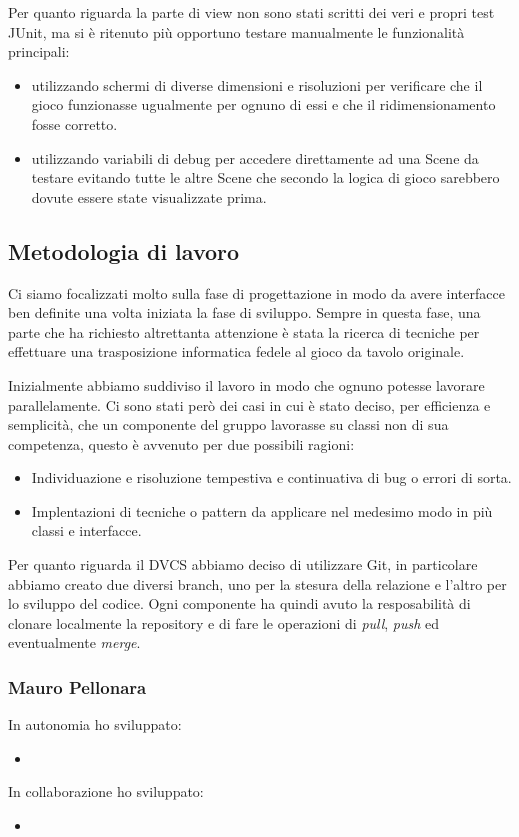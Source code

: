 Per quanto riguarda la parte di view non sono stati scritti dei veri e propri test JUnit, ma si è ritenuto più opportuno testare manualmente le funzionalità principali:
\begin{itemize}
    \item utilizzando schermi di diverse dimensioni e risoluzioni per verificare che il gioco funzionasse ugualmente per ognuno di essi e che il ridimensionamento fosse corretto.
    \item utilizzando variabili di debug per accedere direttamente ad una Scene da testare evitando tutte le altre Scene che secondo la logica di gioco sarebbero dovute essere state visualizzate prima.
\end{itemize}

\subsection{Metodologia di lavoro}
Ci siamo focalizzati molto sulla fase di progettazione in modo da avere interfacce ben definite una volta iniziata la fase di sviluppo. Sempre in questa fase, una parte che ha richiesto altrettanta attenzione è stata la ricerca di tecniche per effettuare una trasposizione informatica fedele al gioco da tavolo originale.
\medskip

Inizialmente abbiamo suddiviso il lavoro in modo che ognuno potesse lavorare parallelamente. Ci sono stati però dei casi in cui è stato deciso, per efficienza e semplicità, che un componente del gruppo lavorasse su classi non di sua competenza, questo è avvenuto per due possibili ragioni:
\begin{itemize}
    \item Individuazione e risoluzione tempestiva e continuativa di bug o errori di sorta.
    \item Implentazioni di tecniche o pattern da applicare nel medesimo modo in più classi e interfacce.
\end{itemize}

Per quanto riguarda il DVCS abbiamo deciso di utilizzare Git, in particolare abbiamo creato due diversi branch, uno per la stesura della relazione e l'altro per lo sviluppo del codice. Ogni componente ha quindi avuto la resposabilità di clonare localmente la repository e di fare le operazioni di \textit{pull}, \textit{push} ed eventualmente \textit{merge}.
\subsubsection*{Mauro Pellonara}
In autonomia ho sviluppato:
\begin{itemize}
    \item
\end{itemize}
In collaborazione ho sviluppato:
\begin{itemize}
    \item
\end{itemize}

